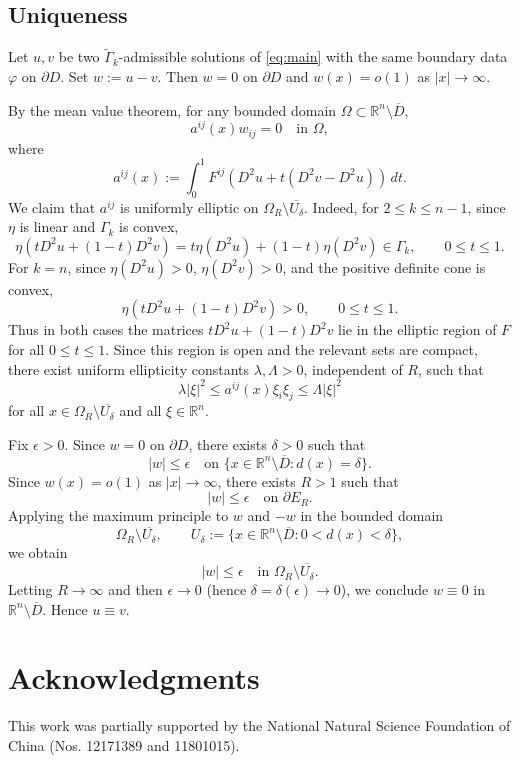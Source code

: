 \documentclass[reqno,a4paper]{amsart}
\numberwithin{equation}{section}
\begin{document}
	\subsection{Uniqueness}
	Let $u, v$ be two $\widetilde{\Gamma}_k$-admissible solutions of \eqref{eq:main} with the same boundary data $\varphi$ on $\partial D$. Set $w:=u-v$. Then $w=0$ on $\partial D$ and $w(x)=o(1)$ as $|x|\to\infty$.
	
	By the mean value theorem, for any bounded domain $\Omega\subset\mathbb{R}^n\setminus\overline{D}$,
	\[
	a^{ij}(x)w_{ij}=0 \quad \text{in } \Omega,
	\]
	where
	\[
	a^{ij}(x):=\int_0^1 F^{ij}(D^2u+t(D^2v-D^2u))\,dt.
	\]
	We claim that $a^{ij}$ is uniformly elliptic on $\Omega_R\setminus\overline{U_\delta}$. Indeed, for $2\le k\le n-1$, since $\eta$ is linear and $\Gamma_k$ is convex,
	\[
	\eta(tD^2u+(1-t)D^2v)
	=
	t\eta(D^2u)+(1-t)\eta(D^2v)
	\in \Gamma_k,\qquad 0\le t\le 1.
	\]
	For $k=n$, since $\eta(D^2u)>0$, $\eta(D^2v)>0$, and the positive definite cone is convex,
	\[
	\eta(tD^2u+(1-t)D^2v)>0,\qquad 0\le t\le 1.
	\]
	Thus in both cases the matrices $tD^2u+(1-t)D^2v$ lie in the elliptic region of $F$ for all $0\le t\le 1$. Since this region is open and the relevant sets are compact, there exist uniform ellipticity constants $\lambda,\Lambda>0$, independent of $R$, such that
	\[
	\lambda |\xi|^2 \le a^{ij}(x)\xi_i\xi_j \le \Lambda |\xi|^2
	\]
	for all $x\in\Omega_R\setminus\overline{U_\delta}$ and all $\xi\in\mathbb{R}^n$.
	
	Fix $\epsilon>0$. Since $w=0$ on $\partial D$, there exists $\delta>0$ such that
	\[
	|w|\le\epsilon \quad \text{on } \{x\in\mathbb{R}^n\setminus\overline{D}:d(x)=\delta\}.
	\]
	Since $w(x)=o(1)$ as $|x|\to\infty$, there exists $R>1$ such that
	\[
	|w|\le\epsilon \quad \text{on } \partial E_R.
	\]
	Applying the maximum principle to $w$ and $-w$ in the bounded domain
	\[
	\Omega_R\setminus\overline{U_\delta},\qquad U_\delta:=\{x\in\mathbb{R}^n\setminus\overline{D}:0<d(x)<\delta\},
	\]
	we obtain
	\[
	|w|\le\epsilon \quad \text{in } \Omega_R\setminus\overline{U_\delta}.
	\]
	Letting $R\to\infty$ and then $\epsilon\to0$ (hence $\delta=\delta(\epsilon)\to0$), we conclude $w\equiv0$ in $\mathbb{R}^n\setminus\overline{D}$. Hence $u\equiv v$.
	
	\section*{Acknowledgments}
	
	This work was partially supported by the National Natural Science Foundation of China 
	(Nos. 12171389 and 11801015).
	
\end{document}
